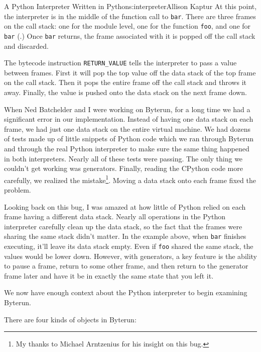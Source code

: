 \begin{aosachapter}{A Python Interpreter Written in Python}{s:interpreter}{Allison Kaptur}
At this point, the interpreter is in the middle of the function call to
\texttt{bar}. There are three frames on the call stack: one for the
module level, one for the function \texttt{foo}, and one for
\texttt{bar} (.) Once
\texttt{bar} returns, the frame associated with it is popped off the
call stack and discarded.

The bytecode instruction \texttt{RETURN\_VALUE} tells the interpreter to
pass a value between frames. First it will pop the top value off the
data stack of the top frame on the call stack. Then it pops the entire
frame off the call stack and throws it away. Finally, the value is
pushed onto the data stack on the next frame down.

When Ned Batchelder and I were working on Byterun, for a long time we
had a significant error in our implementation. Instead of having one
data stack on each frame, we had just one data stack on the entire
virtual machine. We had dozens of tests made up of little snippets of
Python code which we ran through Byterun and through the real Python
interpreter to make sure the same thing happened in both interpreters.
Nearly all of these tests were passing. The only thing we couldn't get
working was generators. Finally, reading the CPython code more
carefully, we realized the mistake\footnote{My thanks to Michael
  Arntzenius for his insight on this bug.}. Moving a data stack onto
each frame fixed the problem.

Looking back on this bug, I was amazed at how little of Python relied on
each frame having a different data stack. Nearly all operations in the
Python interpreter carefully clean up the data stack, so the fact that
the frames were sharing the same stack didn't matter. In the example
above, when \texttt{bar} finishes executing, it'll leave its data stack
empty. Even if \texttt{foo} shared the same stack, the values would be
lower down. However, with generators, a key feature is the ability to
pause a frame, return to some other frame, and then return to the
generator frame later and have it be in exactly the same state that you
left it.

\label{byterun}

We now have enough context about the Python interpreter to begin
examining Byterun.

There are four kinds of objects in Byterun:

\begin{aosaitemize}


\end{aosaitemize}
\end{aosachapter}
